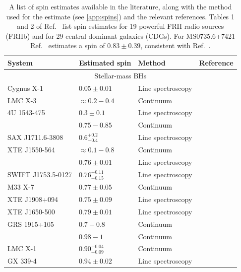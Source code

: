 \documentclass[]{iopart}
\begin{document}
\begin{table}[ht]
  \caption{\label{tab:spins} A list of spin estimates available in the
    literature, along with the method used for the estimate (see
    \ref{app:spins}) and the relevant references. Tables 1 and 2 of
    Ref.~\cite{Daly:2009ih} list spin estimates for 19 powerful FRII radio
    sources (FRIIb) and for 29 central dominant galaxies (CDGs). For
    MS0735.6+7421 Ref.~\cite{Daly:2009ih} estimates a spin of $0.83 \pm 0.39$,
    consistent with Ref.~\cite{McNamara:2008dy}.}
\begin{tabular}{llll}  
\hline
\hline
System & Estimated spin & Method &Reference\\
\hline
\multicolumn{4}{c}{Stellar-mass BHs}\\ 
Cygnus X-1         & $0.05\pm 0.01$ & Line spectroscopy & \cite{Miller:2009cw}\\
LMC X-3            & $\approx 0.2-0.4$ & Continuum& \cite{Davis:2006cm} \\
4U 1543-475        & $0.3\pm 0.1$  & Line spectroscopy & \cite{Miller:2009cw} \\
                   & $0.75-0.85$   & Continuum & \cite{Shafee:2005ef} \\
SAX J1711.6-3808   & $0.6^{+0.2}_{-0.4}$ & Line spectroscopy & \cite{Miller:2009cw}\\
XTE J1550-564      & $\approx 0.1-0.8$     & Continuum & \cite{Davis:2006cm} \\
                   & $0.76\pm 0.01$ & Line spectroscopy & \cite{Miller:2009cw} \\
SWIFT J1753.5-0127 &$0.76^{+0.11}_{-0.15}$ & Line spectroscopy &\cite{Reis:2009jk}\\
M33 X-7            & $0.77\pm 0.05$& Continuum & \cite{Liu:2008tk} \\
XTE J1908+094      & $0.75\pm 0.09$ & Line spectroscopy & \cite{Miller:2009cw}\\
XTE J1650-500      & $0.79\pm 0.01$& Line spectroscopy & \cite{Miller:2009cw}\\
GRS 1915+105       & $0.7-0.8$     & Continuum & \cite{Middleton:2006kj} \\
                   & $0.98-1$      & Continuum & \cite{Zhang:1997dy,McClintock:2006xd} \\
LMC X-1            & $0.90^{+0.04}_{-0.09}$ & Continuum & \cite{Gou:2009ks} \\
GX 339-4           & $0.94\pm 0.02$& Line spectroscopy & \cite{Miller:2008vc,Miller:2009cw}\\%

\end{tabular}
\end{table}
\end{document}
